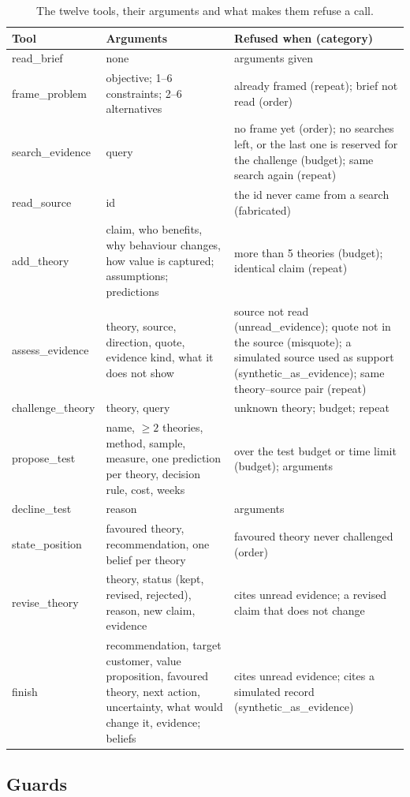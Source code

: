 \begin{table}[H]\centering\small
\caption{The twelve tools, their arguments and what makes them refuse a call.}\label{tab:tools}
\begin{tabularx}{\linewidth}{@{}>{\ttfamily}l X X@{}}
\toprule
\normalfont Tool & Arguments & Refused when (category)\\
\midrule
read\_brief & none & arguments given\\
frame\_problem & objective; 1--6 constraints; 2--6 alternatives & already framed (repeat); brief not read (order)\\
search\_evidence & query & no frame yet (order); no searches left, or the last one is reserved for the challenge (budget); same search again (repeat)\\
read\_source & id & the id never came from a search (fabricated)\\
add\_theory & claim, who benefits, why behaviour changes, how value is captured; assumptions; predictions & more than 5 theories (budget); identical claim (repeat)\\
assess\_evidence & theory, source, direction, quote, evidence kind, what it does not show & source not read (unread\_evidence); quote not in the source (misquote); a simulated source used as support (synthetic\_as\_evidence); same theory--source pair (repeat)\\
challenge\_theory & theory, query & unknown theory; budget; repeat\\
propose\_test & name, $\ge2$ theories, method, sample, measure, one prediction per theory, decision rule, cost, weeks & over the test budget or time limit (budget); arguments\\
decline\_test & reason & arguments\\
state\_position & favoured theory, recommendation, one belief per theory & favoured theory never challenged (order)\\
revise\_theory & theory, status (kept, revised, rejected), reason, new claim, evidence & cites unread evidence; a revised claim that does not change\\
finish & recommendation, target customer, value proposition, favoured theory, next action, uncertainty, what would change it, evidence; beliefs & cites unread evidence; cites a simulated record (synthetic\_as\_evidence)\\
\bottomrule
\end{tabularx}
\end{table}

\subsection{Guards}
